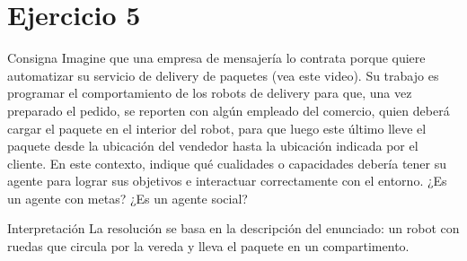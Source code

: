 \documentclass[11pt,a4paper]{article}
\begin{document}
\section{Ejercicio 5}

\begin{enunciado}{Consigna}
Imagine que una empresa de mensajería lo contrata porque quiere automatizar su servicio de delivery de paquetes (vea este video). Su trabajo es programar el comportamiento de los robots de delivery para que, una vez preparado el pedido, se reporten con algún empleado del comercio, quien deberá cargar el paquete en el interior del robot, para que luego este último lleve el paquete desde la ubicación del vendedor hasta la ubicación indicada por el cliente. En este contexto, indique qué cualidades o capacidades debería tener su agente para lograr sus objetivos e interactuar correctamente con el entorno. ¿Es un agente con metas? ¿Es un agente social?
\end{enunciado}

\begin{aviso}{Interpretación}
La resolución se basa en la descripción del enunciado: un robot con ruedas que circula por la vereda y lleva el paquete en un compartimento.
\end{aviso}
\end{document}
